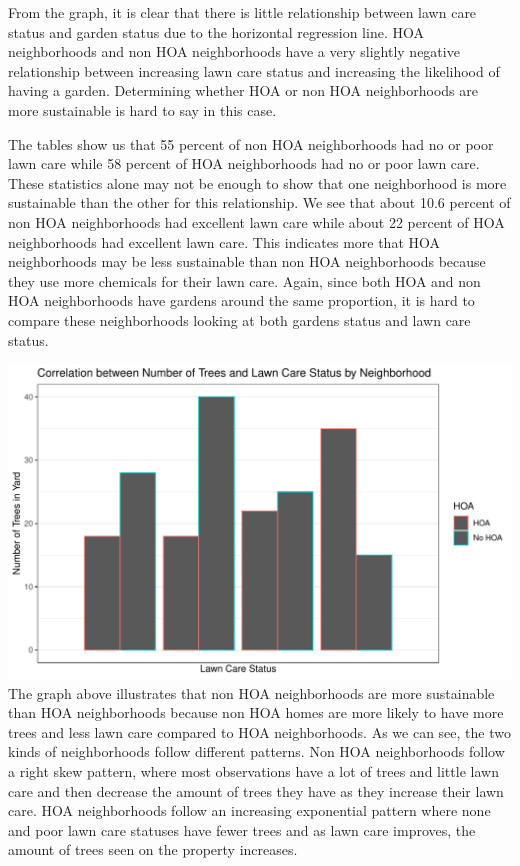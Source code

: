 \documentclass{article}
\begin{document}
From the graph, it is clear that there is little relationship between lawn care status and garden status due to the horizontal regression line. HOA neighborhoods and non HOA neighborhoods have a very slightly negative relationship between increasing lawn care status and increasing the likelihood of having a garden. Determining whether HOA or non HOA neighborhoods are more sustainable is hard to say in this case.

The tables show us that 55 percent of non HOA neighborhoods had no or poor lawn care while 58 percent of HOA neighborhoods had no or poor lawn care. These statistics alone may not be enough to show that one neighborhood is more sustainable than the other for this relationship. We see that about 10.6 percent of non HOA neighborhoods had excellent lawn care while about 22 percent of HOA neighborhoods had excellent lawn care. This indicates more that HOA neighborhoods may be less sustainable than non HOA neighborhoods because they use more chemicals for their lawn care. Again, since both HOA and non HOA neighborhoods have gardens around the same proportion, it is hard to compare these neighborhoods looking at both gardens status and lawn care status.
\newpage


\includegraphics{exam1-019}
\newline
The graph above illustrates that non HOA neighborhoods are more sustainable than HOA neighborhoods because non HOA homes are more likely to have more trees and less lawn care compared to HOA neighborhoods. As we can see, the two kinds of neighborhoods follow different patterns. Non HOA neighborhoods follow a right skew pattern, where most observations have a lot of trees and little lawn care and then decrease the amount of trees they have as they increase their lawn care. HOA neighborhoods follow an increasing exponential pattern where none and poor lawn care statuses have fewer trees and as lawn care improves, the amount of trees seen on the property increases.
\newpage
\end{document}
